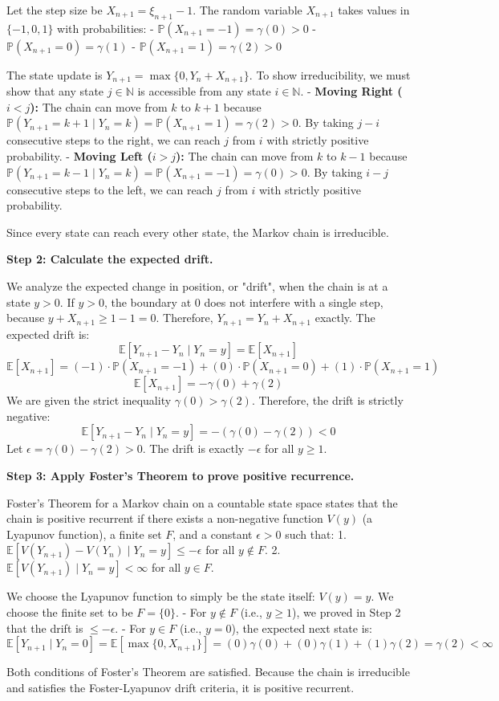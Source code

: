 \begin{solution}
Let the step size be $X_{n+1} = \xi_{n+1} - 1$. The random variable $X_{n+1}$ takes values in $\{-1, 0, 1\}$ with probabilities:
- $\mathbb{P}(X_{n+1} = -1) = \gamma(0) > 0$
- $\mathbb{P}(X_{n+1} = 0) = \gamma(1)$
- $\mathbb{P}(X_{n+1} = 1) = \gamma(2) > 0$

The state update is $Y_{n+1} = \max\{0, Y_n + X_{n+1}\}$.
To show irreducibility, we must show that any state $j \in \mathbb{N}$ is accessible from any state $i \in \mathbb{N}$.
- \textbf{Moving Right ($i < j$):} The chain can move from $k$ to $k+1$ because $\mathbb{P}(Y_{n+1} = k+1 \mid Y_n = k) = \mathbb{P}(X_{n+1} = 1) = \gamma(2) > 0$. By taking $j-i$ consecutive steps to the right, we can reach $j$ from $i$ with strictly positive probability.
- \textbf{Moving Left ($i > j$):} The chain can move from $k$ to $k-1$ because $\mathbb{P}(Y_{n+1} = k-1 \mid Y_n = k) = \mathbb{P}(X_{n+1} = -1) = \gamma(0) > 0$. By taking $i-j$ consecutive steps to the left, we can reach $j$ from $i$ with strictly positive probability.

Since every state can reach every other state, the Markov chain is irreducible.

\textbf{Step 2: Calculate the expected drift.}

We analyze the expected change in position, or "drift", when the chain is at a state $y > 0$.
If $y > 0$, the boundary at 0 does not interfere with a single step, because $y + X_{n+1} \geq 1 - 1 = 0$. Therefore, $Y_{n+1} = Y_n + X_{n+1}$ exactly.
The expected drift is:
\[ \mathbb{E}[Y_{n+1} - Y_n \mid Y_n = y] = \mathbb{E}[X_{n+1}] \]
\[ \mathbb{E}[X_{n+1}] = (-1) \cdot \mathbb{P}(X_{n+1} = -1) + (0) \cdot \mathbb{P}(X_{n+1} = 0) + (1) \cdot \mathbb{P}(X_{n+1} = 1) \]
\[ \mathbb{E}[X_{n+1}] = -\gamma(0) + \gamma(2) \]
We are given the strict inequality $\gamma(0) > \gamma(2)$. Therefore, the drift is strictly negative:
\[ \mathbb{E}[Y_{n+1} - Y_n \mid Y_n = y] = -(\gamma(0) - \gamma(2)) < 0 \]
Let $\epsilon = \gamma(0) - \gamma(2) > 0$. The drift is exactly $-\epsilon$ for all $y \geq 1$.

\textbf{Step 3: Apply Foster's Theorem to prove positive recurrence.}

Foster's Theorem for a Markov chain on a countable state space states that the chain is positive recurrent if there exists a non-negative function $V(y)$ (a Lyapunov function), a finite set $F$, and a constant $\epsilon > 0$ such that:
1. $\mathbb{E}[V(Y_{n+1}) - V(Y_n) \mid Y_n = y] \leq -\epsilon$ for all $y \notin F$.
2. $\mathbb{E}[V(Y_{n+1}) \mid Y_n = y] < \infty$ for all $y \in F$.

We choose the Lyapunov function to simply be the state itself: $V(y) = y$.
We choose the finite set to be $F = \{0\}$.
- For $y \notin F$ (i.e., $y \geq 1$), we proved in Step 2 that the drift is $\leq -\epsilon$.
- For $y \in F$ (i.e., $y = 0$), the expected next state is:
\[ \mathbb{E}[Y_{n+1} \mid Y_n = 0] = \mathbb{E}[\max\{0, X_{n+1}\}] = (0)\gamma(0) + (0)\gamma(1) + (1)\gamma(2) = \gamma(2) < \infty \]

Both conditions of Foster's Theorem are satisfied. Because the chain is irreducible and satisfies the Foster-Lyapunov drift criteria, it is positive recurrent.
\end{solution}

